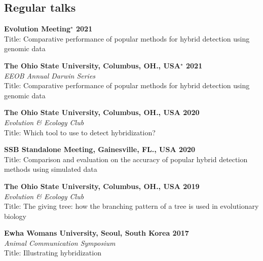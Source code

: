 \documentclass[11pt,letterpaper,sans]{moderncv} %
\begin{document}
\subsection{Regular talks}
\begin{etaremune}
	\item \textbf{Evolution Meeting$^\star$ \hfill 2021}\\
		{\small Title: Comparative performance of popular methods for hybrid detection using genomic data}

	\item \textbf{The Ohio State University, Columbus, OH., USA$^\star$ \hfill 2021}\\
		{\small \textit{EEOB Annual Darwin Series}\\
		Title: Comparative performance of popular methods for hybrid detection using genomic data}

	\item \textbf{The Ohio State University, Columbus, OH., USA \hfill 2020}\\
		{\small \textit{Evolution \& Ecology Club}\\
		Title: Which tool to use to detect hybridization?}

	\item \textbf{SSB Standalone Meeting, Gainesville, FL., USA \hfill 2020}\\
		{\small Title: Comparison and evaluation on the accuracy of popular hybrid detection methods using simulated data}

	\item \textbf{The Ohio State University, Columbus, OH., USA \hfill 2019}\\
		{\small \textit{Evolution \& Ecology Club}\\
		Title: The giving tree: how the branching pattern of a tree is used in evolutionary biology}

	\item \textbf{Ewha Womans University, Seoul, South Korea \hfill 2017}\\
		{\small \textit{Animal Communication Symposium}\\
		Title: Illustrating hybridization}
\end{etaremune}
\end{document}
